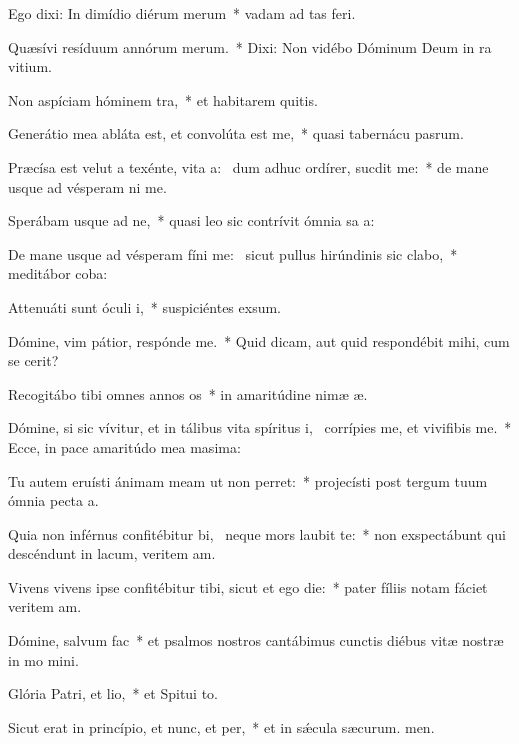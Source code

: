 \item Ego dixi: In dimídio diérum merum~* vadam ad tas feri.
\item Quæsívi resíduum annórum merum.~* Dixi: Non vidébo Dóminum Deum in ra vitium.
\item Non aspíciam hóminem tra,~* et habitarem quitis.
\item Generátio mea abláta est, et convolúta est  me,~* quasi tabernácu pasrum.
\item Præcísa est velut a texénte, vita a:~\pscross{} dum adhuc ordírer, sucdit me:~* de mane usque ad vésperam ni me.
\item Sperábam usque ad ne,~* quasi leo sic contrívit ómnia sa a:
\item De mane usque ad vésperam fíni me:~\pscross{} sicut pullus hirúndinis sic clabo,~* meditábor  coba:
\item Attenuáti sunt óculi i,~* suspiciéntes  exsum.
\item Dómine, vim pátior, respónde  me.~* Quid dicam, aut quid respondébit mihi, cum se cerit?
\item Recogitábo tibi omnes annos os~* in amaritúdine nimæ æ.
\item Dómine, si sic vívitur, et in tálibus vita spíritus i,~\pscross{} corrípies me, et vivifibis me.~* Ecce, in pace amaritúdo mea masima:
\item Tu autem eruísti ánimam meam ut non perret:~* projecísti post tergum tuum ómnia pecta a.
\item Quia non inférnus confitébitur bi,~\pscross{} neque mors laubit te:~* non exspectábunt qui descéndunt in lacum, veritem am.
\item Vivens vivens ipse confitébitur tibi, sicut et ego die:~* pater fíliis notam fáciet veritem am.
\item Dómine, salvum  fac~* et psalmos nostros cantábimus cunctis diébus vitæ nostræ in mo mini.
\item Glória Patri, et lio,~* et Spitui to.
\item Sicut erat in princípio, et nunc, et per,~* et in sǽcula sæcurum. men.
